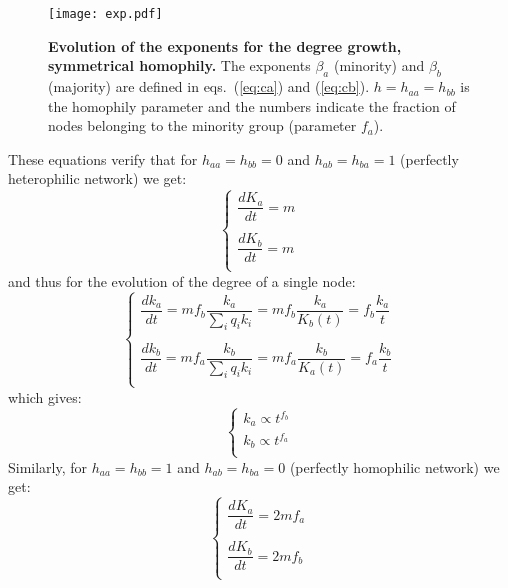 \normalsize

\begin{figure}[]
\centering
\texttt{[image: exp.pdf]}
\caption{\textbf{Evolution of the exponents for the degree growth, symmetrical homophily.} The exponents $\beta_a$ (minority) and $\beta_b$ (majority) are defined in eqs.~(\ref{eq:ca}) and (\ref{eq:cb}). $h = h_{aa} = h_{bb}$ is the homophily parameter and the numbers indicate the fraction of nodes belonging to the minority group (parameter $f_a$).}
\label{fig:exponents}
\end{figure}

These equations verify that for $h_{aa} = h_{bb} = 0$ and $h_{ab} = h_{ba} = 1$ (perfectly heterophilic network) we get:
\small
\begin{equation}
\left\{
  \begin{array}{l}
    \dfrac{dK_a}{dt} = m\\
    \\
    \dfrac{dK_b}{dt} = m\\
  \end{array}
\right.
\end{equation}
\normalsize
and thus for the evolution of the degree of a single node:
\small
\begin{equation}
\left\{
  \begin{array}{l}
    \dfrac{dk_a}{dt} = mf_b\dfrac{k_a}{\sum_i q_ik_i} = mf_b\dfrac{k_a}{K_b(t)} = f_b\dfrac{k_a}{t}\\
    \\
    \dfrac{dk_b}{dt} = mf_a\dfrac{k_b}{\sum_i q_ik_i} = mf_a\dfrac{k_b}{K_a(t)} = f_a\dfrac{k_b}{t}\\
  \end{array}
\right.
\end{equation}
\normalsize
which gives:
\begin{equation}
\left\{
  \begin{array}{l}
    k_a \propto t^{f_b}\\
    k_b \propto t^{f_a}\\
  \end{array}
\right.
\end{equation}
Similarly, for $h_{aa} = h_{bb} = 1$ and $h_{ab} = h_{ba} = 0$ (perfectly homophilic network) we get:
\small
\begin{equation}
\left\{
  \begin{array}{l}
    \dfrac{dK_a}{dt} = 2mf_a\\
    \\
    \dfrac{dK_b}{dt} = 2mf_b\\
  \end{array}
\right.
\end{equation}
